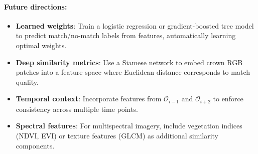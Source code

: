\paragraph{Future directions:}
\begin{itemize}
    \item \textbf{Learned weights}: Train a logistic regression or gradient-boosted tree model to predict match/no-match labels from features, automatically learning optimal weights.
    \item \textbf{Deep similarity metrics}: Use a Siamese network to embed crown RGB patches into a feature space where Euclidean distance corresponds to match quality.
    \item \textbf{Temporal context}: Incorporate features from $\mathcal{O}_{i-1}$ and $\mathcal{O}_{i+2}$ to enforce consistency across multiple time points.
    \item \textbf{Spectral features}: For multispectral imagery, include vegetation indices (NDVI, EVI) or texture features (GLCM) as additional similarity components.
\end{itemize}
